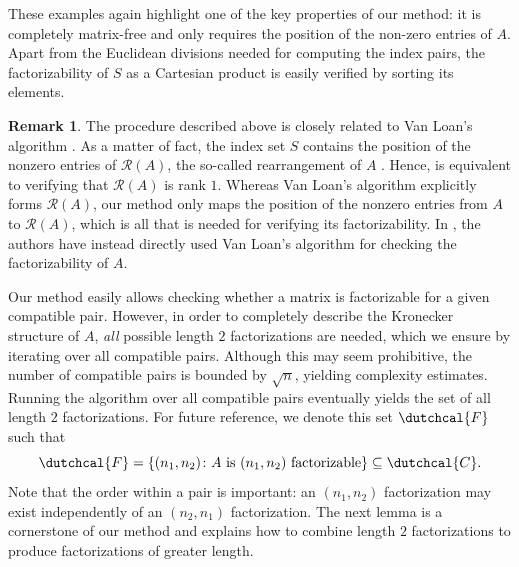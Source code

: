 \documentclass{article}
\numberwithin{equation}{section}
\theoremstyle{definition}
\newtheorem{remark}[definition]{Remark}
\begin{document}
These examples again highlight one of the key properties of our method: it is completely matrix-free and only requires the position of the non-zero entries of $A$. Apart from the Euclidean divisions needed for computing the index pairs, the factorizability of $S$ as a Cartesian product is easily verified by sorting its elements.

\begin{remark}
The procedure described above is closely related to Van Loan's algorithm \cite{van1993approximation}. As a matter of fact, the index set $S$ contains the position of the nonzero entries of $\mathcal{R}(A)$, the so-called rearrangement of $A$ \cite{van1993approximation}. Hence,  is equivalent to verifying that $\mathcal{R}(A)$ is rank $1$. Whereas Van Loan's algorithm explicitly forms $\mathcal{R}(A)$, our method only maps the position of the nonzero entries from $A$ to $\mathcal{R}(A)$, which is all that is needed for verifying its factorizability. In \cite{calderoni2023heuristic}, the authors have instead directly used Van Loan's algorithm for checking the factorizability of $A$.
\end{remark}

Our method easily allows checking whether a matrix is factorizable for a given compatible pair. However, in order to completely describe the Kronecker structure of $A$, \emph{all} possible length $2$ factorizations are needed, which we ensure by iterating over all compatible pairs. Although this may seem prohibitive, the number of compatible pairs is bounded by $\sqrt{n}$, yielding complexity estimates. Running the algorithm over all compatible pairs eventually yields the set of all length $2$ factorizations. For future reference, we denote this set $\dutchcal{F}$ such that
\begin{equation*}
    \dutchcal{F}=\{(n_1,n_2) \colon A \text{ is } (n_1,n_2) \text{ factorizable}\} \subseteq \dutchcal{C}.
\end{equation*}
Note that the order within a pair is important: an $(n_1,n_2)$ factorization may exist independently of an $(n_2,n_1)$ factorization. The next lemma is a cornerstone of our method and explains how to combine length $2$ factorizations to produce factorizations of greater length.
\end{document}
